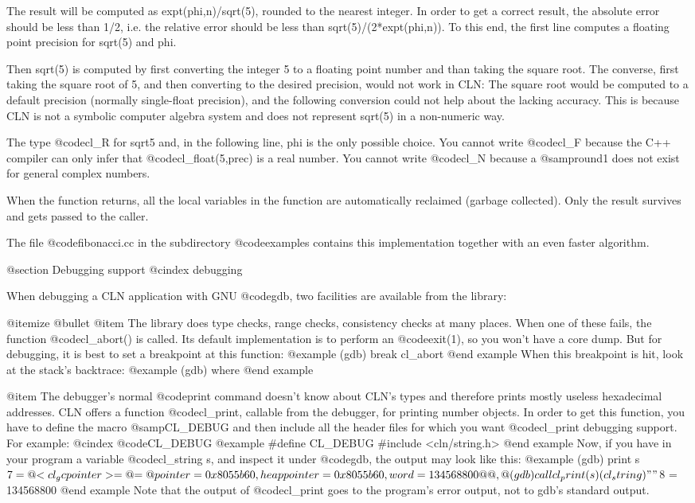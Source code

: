 The result will be computed as expt(phi,n)/sqrt(5), rounded to the nearest
integer. In order to get a correct result, the absolute error should be less
than 1/2, i.e. the relative error should be less than sqrt(5)/(2*expt(phi,n)).
To this end, the first line computes a floating point precision for sqrt(5)
and phi.

Then sqrt(5) is computed by first converting the integer 5 to a floating point
number and than taking the square root. The converse, first taking the square
root of 5, and then converting to the desired precision, would not work in
CLN: The square root would be computed to a default precision (normally
single-float precision), and the following conversion could not help about
the lacking accuracy. This is because CLN is not a symbolic computer algebra
system and does not represent sqrt(5) in a non-numeric way.

The type @code{cl_R} for sqrt5 and, in the following line, phi is the only
possible choice. You cannot write @code{cl_F} because the C++ compiler can
only infer that @code{cl_float(5,prec)} is a real number. You cannot write
@code{cl_N} because a @samp{round1} does not exist for general complex
numbers.

When the function returns, all the local variables in the function are
automatically reclaimed (garbage collected). Only the result survives and
gets passed to the caller.

The file @code{fibonacci.cc} in the subdirectory @code{examples}
contains this implementation together with an even faster algorithm.

@section Debugging support
@cindex debugging

When debugging a CLN application with GNU @code{gdb}, two facilities are
available from the library:

@itemize @bullet
@item The library does type checks, range checks, consistency checks at
many places. When one of these fails, the function @code{cl_abort()} is
called. Its default implementation is to perform an @code{exit(1)}, so
you won't have a core dump. But for debugging, it is best to set a
breakpoint at this function:
@example
(gdb) break cl_abort
@end example
When this breakpoint is hit, look at the stack's backtrace:
@example
(gdb) where
@end example

@item The debugger's normal @code{print} command doesn't know about
CLN's types and therefore prints mostly useless hexadecimal addresses.
CLN offers a function @code{cl_print}, callable from the debugger,
for printing number objects. In order to get this function, you have
to define the macro @samp{CL_DEBUG} and then include all the header files
for which you want @code{cl_print} debugging support. For example:
@cindex @code{CL_DEBUG}
@example
#define CL_DEBUG
#include <cln/string.h>
@end example
Now, if you have in your program a variable @code{cl_string s}, and
inspect it under @code{gdb}, the output may look like this:
@example
(gdb) print s
$7 = @{<cl_gcpointer> = @{ = @{pointer = 0x8055b60, heappointer = 0x8055b60,
  word = 134568800@}@}, @}
(gdb) call cl_print(s)
(cl_string) ""
$8 = 134568800
@end example
Note that the output of @code{cl_print} goes to the program's error output,
not to gdb's standard output.

